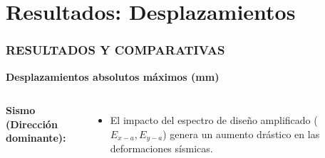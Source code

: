 \documentclass[11.5pt,aspectratio=169,handout]{beamer}
\newcommand{\ctitle}[1]{\frametitle{#1}}
\begin{document}
\section{Resultados: Desplazamientos}

\begin{frame}
\ctitle{RESULTADOS Y COMPARATIVAS}
\vspace{-4mm}
\begin{center}
  \textcolor{azulUSACH}{\textbf{Desplazamientos absolutos máximos (mm)}}
\end{center}
\vspace{1mm}
\begin{columns}[T,totalwidth=\textwidth]
  \vspace{-1mm}
  {\footnotesize\textbf{Sismo (Dirección dominante):}}\\[2mm]
  \\[3mm]
  \begin{itemize}\scriptsize\setlength{\itemsep}{2mm}
    \item El impacto del espectro de diseño amplificado ($E_{x-a}, E_{y-a}$) genera un aumento drástico en las deformaciones sísmicas.
  \end{itemize}


\end{columns}
\end{frame}
\end{document}
